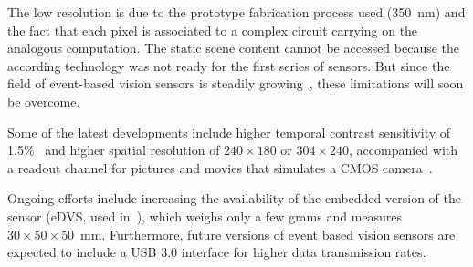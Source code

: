 The low resolution is due to the prototype fabrication process used
(350~nm) and the fact that each pixel is associated to a complex
circuit carrying on the analogous computation. The static scene content
cannot be accessed because the according technology was not ready
for the first series of sensors. But since the field of event-based
vision sensors is steadily growing~\cite{delbruck10activity}, these
limitations will soon be overcome. 

Some of the latest developments include higher temporal contrast sensitivity
of 1.5\%~\cite{serrano13128} and higher spatial resolution of $240\times180$
or $304\times240$, accompanied with a readout channel for pictures
and movies that simulates a CMOS camera~\cite{posch11qvga,berner13240}. 

Ongoing efforts include increasing the availability of the embedded
version of the sensor (eDVS, used in~\cite{conradt09pencil}), which
weighs only a few grams and measures $30\times50\times50$~mm. Furthermore,
future versions of event based vision sensors are expected to include
a USB 3.0 interface for higher data transmission rates.
